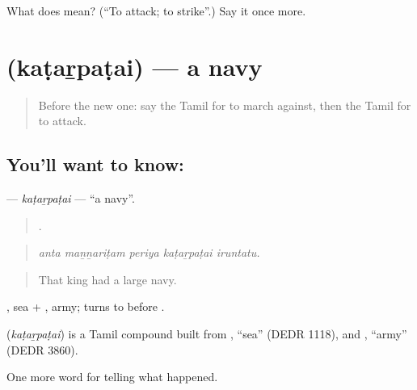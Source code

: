 \begin{tcolorbox}[breakable,colback=teal!4,colframe=teal!35!black,title={Before you move on}]
What does  mean? (\textquotedblleft{}To attack; to strike\textquotedblright{}.) Say it once more.
\end{tcolorbox}
\section[\texorpdfstring{\ta{கடற்படை} (kaṭaṟpaṭai)}{கடற்படை (kaṭaṟpaṭai)}]{ (kaṭaṟpaṭai) — a navy}

\label{lesson:TA-C332-katarpatai}



\begin{quote}
Before the new one: say the Tamil for to march against, then the Tamil for to attack.
\end{quote}

\subsection*{You'll want to know: }
\textbf{} — \emph{kaṭaṟpaṭai} — \textquotedblleft{}a navy\textquotedblright{}.

\begin{quote}
    .
\end{quote}

\begin{quote}
\emph{anta maṉṉariṭam periya kaṭaṟpaṭai iruntatu.}
\end{quote}

\begin{quote}
That king had a large navy.
\end{quote}

, sea + , army;  turns to  before .

\begin{cousinweb}
\textbf{} (\emph{kaṭaṟpaṭai}) is a Tamil compound built from , \textquotedblleft{}sea\textquotedblright{} (DEDR 1118), and , \textquotedblleft{}army\textquotedblright{} (DEDR 3860).
\end{cousinweb}

\begin{grammarlens}[title={What you've built}]
One more word for telling what happened.
\end{grammarlens}

